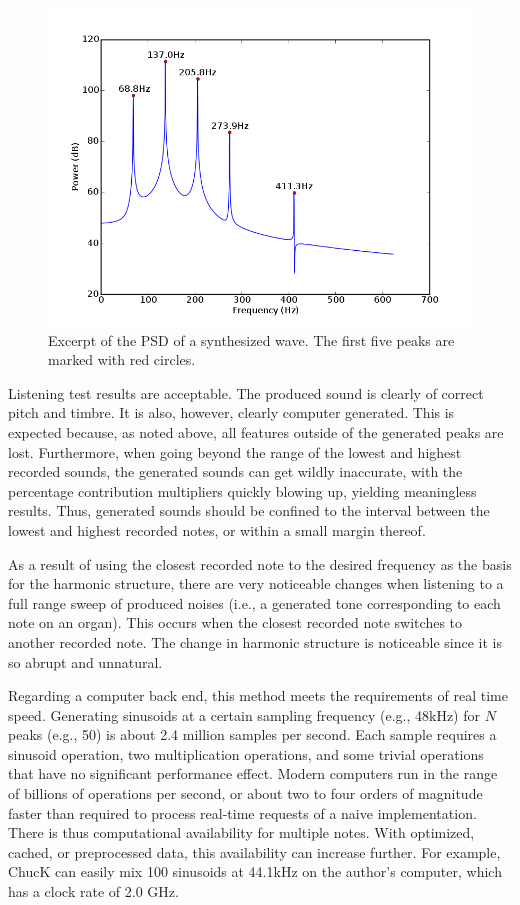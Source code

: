 \documentclass[twocolumn]{article}
\begin{document}
\begin{figure}
\centering
\includegraphics[width=\linewidth]{figures/synth-peaks.png}
\caption{Excerpt of the PSD of a synthesized wave. The first five peaks are marked with red circles.}
\label{synth-peaks}
\end{figure}

Listening test results are acceptable. The produced sound is clearly of correct pitch and timbre. It is also, however, clearly computer generated. This is expected because, as noted above, all features outside of the generated peaks are lost. Furthermore, when going beyond the range of the lowest and highest recorded sounds, the generated sounds can get wildly inaccurate, with the percentage contribution multipliers quickly blowing up, yielding meaningless results. Thus, generated sounds should be confined to the interval between the lowest and highest recorded notes, or within a small margin thereof.

As a result of using the closest recorded note to the desired frequency as the basis for the harmonic structure, there are very noticeable changes when listening to a full range sweep of produced noises (i.e., a generated tone corresponding to each note on an organ). This occurs when the closest recorded note switches to another recorded note. The change in harmonic structure is noticeable since it is so abrupt and unnatural.

Regarding a computer back end, this method meets the requirements of real time speed. Generating sinusoids at a certain sampling frequency (e.g., 48kHz) for $N$ peaks (e.g., 50) is about 2.4 million samples per second. Each sample requires a sinusoid operation, two multiplication operations, and some trivial operations that have no significant performance effect. Modern computers run in the range of billions of operations per second, or about two to four orders of magnitude faster than required to process real-time requests of a naive implementation. There is thus computational availability for multiple notes. With optimized, cached, or preprocessed data, this availability can increase further. For example, ChucK can easily mix 100 sinusoids at 44.1kHz on the author's computer, which has a clock rate of 2.0 GHz.
\end{document}
